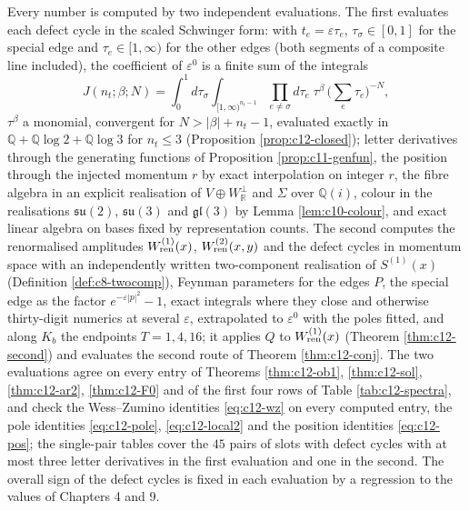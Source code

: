 \begin{remark}
\label{rem:c12-method}
Every number is computed by two independent evaluations. The first evaluates each defect cycle in the scaled Schwinger form: with $t_e=\varepsilon\tau_e$, $\tau_\sigma\in[0,1]$ for the special edge and $\tau_e\in[1,\infty)$ for the other edges (both segments of a composite line included), the coefficient of $\varepsilon^0$ is a finite sum of the integrals
\[
J(n_t;\beta;N)=\int_0^1d\tau_\sigma\int_{[1,\infty)^{n_t-1}}\prod_{e\neq\sigma}d\tau_e\;\tau^\beta\,\Big(\sum_e\tau_e\Big)^{-N},
\]
$\tau^\beta$ a monomial, convergent for $N>|\beta|+n_t-1$, evaluated exactly in $\mathbb Q+\mathbb Q\log2+\mathbb Q\log3$ for $n_t\le3$ (Proposition \ref{prop:c12-closed}); letter derivatives through the generating functions of Proposition \ref{prop:c11-genfun}, the position through the injected momentum $r$ by exact interpolation on integer $r$, the fibre algebra in an explicit realisation of $V\oplus W_{\mathbb R}^\perp$ and $\Sigma$ over $\mathbb Q(i)$, colour in the realisations $\mathfrak{su}(2)$, $\mathfrak{su}(3)$ and $\mathfrak{gl}(3)$ by Lemma \ref{lem:c10-colour}, and exact linear algebra on bases fixed by representation counts. The second computes the renormalised amplitudes $W^{(1)}_{\rm ren}(x)$, $W^{(2)}_{\rm ren}(x,y)$ and the defect cycles in momentum space with an independently written two-component realisation of $S^{(1)}(x)$ (Definition \ref{def:c8-twocomp}), Feynman parameters for the edges $P$, the special edge as the factor $e^{-\varepsilon|p|^2}-1$, exact integrals where they close and otherwise thirty-digit numerics at several $\varepsilon$, extrapolated to $\varepsilon^0$ with the poles fitted, and along $K_b$ the endpoints $T=1,4,16$; it applies $Q$ to $W^{(1)}_{\rm ren}(x)$ (Theorem \ref{thm:c12-second}) and evaluates the second route of Theorem \ref{thm:c12-conj}. The two evaluations agree on every entry of Theorems \ref{thm:c12-ob1}, \ref{thm:c12-sol}, \ref{thm:c12-ar2}, \ref{thm:c12-F0} and of the first four rows of Table \ref{tab:c12-spectra}, and check the Wess--Zumino identities \eqref{eq:c12-wz} on every computed entry, the pole identities \eqref{eq:c12-pole}, \eqref{eq:c12-local2} and the position identities \eqref{eq:c12-pos}; the single-pair tables cover the $45$ pairs of slots with defect cycles with at most three letter derivatives in the first evaluation and one in the second. The overall sign of the defect cycles is fixed in each evaluation by a regression to the values of Chapters 4 and 9.
\end{remark}

